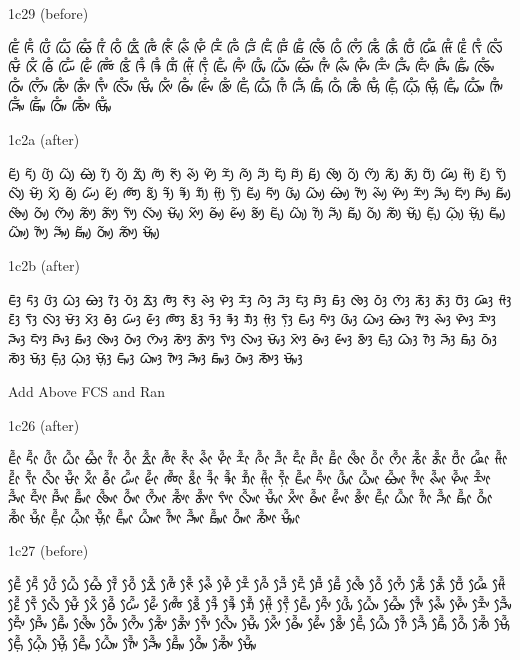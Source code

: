 \noindent
1c29 (before)

\noindent
ᰀᰩᰱ ᰁᰩᰱ ᰂᰩᰱ ᰃᰩᰱ ᰄᰩᰱ ᰅᰩᰱ ᰆᰩᰱ ᰇᰩᰱ ᰈᰩᰱ ᰉᰩᰱ ᰊᰩᰱ ᰋᰩᰱ ᰌᰩᰱ ᰍᰩᰱ ᰎᰩᰱ ᰏᰩᰱ ᰐᰩᰱ ᰑᰩᰱ ᰒᰩᰱ ᰓᰩᰱ ᰔᰩᰱ ᰕᰩᰱ ᰖᰩᰱ ᰗᰩᰱ ᰘᰩᰱ ᰙᰩᰱ ᰚᰩᰱ ᰛᰩᰱ ᰜᰩᰱ ᰝᰩᰱ ᰞᰩᰱ ᰟᰩᰱ ᰠᰩᰱ ᰡᰩᰱ ᰢᰩᰱ ᰣᰩᰱ ᱍᰩᰱ ᱎᰩᰱ ᱏᰩᰱ ᰙ᰷ᰩᰱ ᰛ᰷ᰩᰱ ᰀᰤᰩᰱ ᰁᰤᰩᰱ ᰂᰤᰩᰱ ᰃᰤᰩᰱ ᰄᰤᰩᰱ ᰅᰤᰩᰱ ᰊᰤᰩᰱ ᰋᰤᰩᰱ ᰌᰤᰩᰱ ᰎᰤᰩᰱ ᰏᰤᰩᰱ ᰐᰤᰩᰱ ᰑᰤᰩᰱ ᰒᰤᰩᰱ ᰓᰤᰩᰱ ᰔᰤᰩᰱ ᰕᰤᰩᰱ ᰖᰤᰩᰱ ᰛᰤᰩᰱ ᰜᰤᰩᰱ ᰝᰤᰩᰱ ᰞᰤᰩᰱ ᰟᰤᰩᰱ ᰡᰤᰩᰱ ᰣᰤᰩᰱ ᰀᰥᰩᰱ ᰃᰥᰩᰱ ᰅᰥᰩᰱ ᰎᰥᰩᰱ ᰑᰥᰩᰱ ᰓᰥᰩᰱ ᰕᰥᰩᰱ ᰝᰥᰩᰱ ᰀ᰷ᰥᰩᰱ ᰃ᰷ᰥᰩᰱ ᰝ᰷ᰥᰩᰱ ᰀᰥᰤᰩᰱ ᰃᰥᰤᰩᰱ ᰅᰥᰤᰩᰱ ᰎᰥᰤᰩᰱ ᰑᰥᰤᰩᰱ ᰓᰥᰤᰩᰱ ᰕᰥᰤᰩᰱ ᰝᰥᰤᰩᰱ 

\noindent
1c2a (after)

\noindent
ᰀᰪᰲ ᰁᰪᰲ ᰂᰪᰲ ᰃᰪᰲ ᰄᰪᰲ ᰅᰪᰲ ᰆᰪᰲ ᰇᰪᰲ ᰈᰪᰲ ᰉᰪᰲ ᰊᰪᰲ ᰋᰪᰲ ᰌᰪᰲ ᰍᰪᰲ ᰎᰪᰲ ᰏᰪᰲ ᰐᰪᰲ ᰑᰪᰲ ᰒᰪᰲ ᰓᰪᰲ ᰔᰪᰲ ᰕᰪᰲ ᰖᰪᰲ ᰗᰪᰲ ᰘᰪᰲ ᰙᰪᰲ ᰚᰪᰲ ᰛᰪᰲ ᰜᰪᰲ ᰝᰪᰲ ᰞᰪᰲ ᰟᰪᰲ ᰠᰪᰲ ᰡᰪᰲ ᰢᰪᰲ ᰣᰪᰲ ᱍᰪᰲ ᱎᰪᰲ ᱏᰪᰲ ᰙ᰷ᰪᰲ ᰛ᰷ᰪᰲ ᰀᰤᰪᰲ ᰁᰤᰪᰲ ᰂᰤᰪᰲ ᰃᰤᰪᰲ ᰄᰤᰪᰲ ᰅᰤᰪᰲ ᰊᰤᰪᰲ ᰋᰤᰪᰲ ᰌᰤᰪᰲ ᰎᰤᰪᰲ ᰏᰤᰪᰲ ᰐᰤᰪᰲ ᰑᰤᰪᰲ ᰒᰤᰪᰲ ᰓᰤᰪᰲ ᰔᰤᰪᰲ ᰕᰤᰪᰲ ᰖᰤᰪᰲ ᰛᰤᰪᰲ ᰜᰤᰪᰲ ᰝᰤᰪᰲ ᰞᰤᰪᰲ ᰟᰤᰪᰲ ᰡᰤᰪᰲ ᰣᰤᰪᰲ ᰀᰥᰪᰲ ᰃᰥᰪᰲ ᰅᰥᰪᰲ ᰎᰥᰪᰲ ᰑᰥᰪᰲ ᰓᰥᰪᰲ ᰕᰥᰪᰲ ᰝᰥᰪᰲ ᰀ᰷ᰥᰪᰲ ᰃ᰷ᰥᰪᰲ ᰝ᰷ᰥᰪᰲ ᰀᰥᰤᰪᰲ ᰃᰥᰤᰪᰲ ᰅᰥᰤᰪᰲ ᰎᰥᰤᰪᰲ ᰑᰥᰤᰪᰲ ᰓᰥᰤᰪᰲ ᰕᰥᰤᰪᰲ ᰝᰥᰤᰪᰲ 

\noindent
1c2b (after)

\noindent
ᰀᰫᰳ ᰁᰫᰳ ᰂᰫᰳ ᰃᰫᰳ ᰄᰫᰳ ᰅᰫᰳ ᰆᰫᰳ ᰇᰫᰳ ᰈᰫᰳ ᰉᰫᰳ ᰊᰫᰳ ᰋᰫᰳ ᰌᰫᰳ ᰍᰫᰳ ᰎᰫᰳ ᰏᰫᰳ ᰐᰫᰳ ᰑᰫᰳ ᰒᰫᰳ ᰓᰫᰳ ᰔᰫᰳ ᰕᰫᰳ ᰖᰫᰳ ᰗᰫᰳ ᰘᰫᰳ ᰙᰫᰳ ᰚᰫᰳ ᰛᰫᰳ ᰜᰫᰳ ᰝᰫᰳ ᰞᰫᰳ ᰟᰫᰳ ᰠᰫᰳ ᰡᰫᰳ ᰢᰫᰳ ᰣᰫᰳ ᱍᰫᰳ ᱎᰫᰳ ᱏᰫᰳ ᰙ᰷ᰫᰳ ᰛ᰷ᰫᰳ ᰀᰤᰫᰳ ᰁᰤᰫᰳ ᰂᰤᰫᰳ ᰃᰤᰫᰳ ᰄᰤᰫᰳ ᰅᰤᰫᰳ ᰊᰤᰫᰳ ᰋᰤᰫᰳ ᰌᰤᰫᰳ ᰎᰤᰫᰳ ᰏᰤᰫᰳ ᰐᰤᰫᰳ ᰑᰤᰫᰳ ᰒᰤᰫᰳ ᰓᰤᰫᰳ ᰔᰤᰫᰳ ᰕᰤᰫᰳ ᰖᰤᰫᰳ ᰛᰤᰫᰳ ᰜᰤᰫᰳ ᰝᰤᰫᰳ ᰞᰤᰫᰳ ᰟᰤᰫᰳ ᰡᰤᰫᰳ ᰣᰤᰫᰳ ᰀᰥᰫᰳ ᰃᰥᰫᰳ ᰅᰥᰫᰳ ᰎᰥᰫᰳ ᰑᰥᰫᰳ ᰓᰥᰫᰳ ᰕᰥᰫᰳ ᰝᰥᰫᰳ ᰀ᰷ᰥᰫᰳ ᰃ᰷ᰥᰫᰳ ᰝ᰷ᰥᰫᰳ ᰀᰥᰤᰫᰳ ᰃᰥᰤᰫᰳ ᰅᰥᰤᰫᰳ ᰎᰥᰤᰫᰳ ᰑᰥᰤᰫᰳ ᰓᰥᰤᰫᰳ ᰕᰥᰤᰫᰳ ᰝᰥᰤᰫᰳ 

\noindent
Add Above FCS and Ran

\noindent
1c26 (after)

\noindent
ᰀᰦᰰᰶ ᰁᰦᰰᰶ ᰂᰦᰰᰶ ᰃᰦᰰᰶ ᰄᰦᰰᰶ ᰅᰦᰰᰶ ᰆᰦᰰᰶ ᰇᰦᰰᰶ ᰈᰦᰰᰶ ᰉᰦᰰᰶ ᰊᰦᰰᰶ ᰋᰦᰰᰶ ᰌᰦᰰᰶ ᰍᰦᰰᰶ ᰎᰦᰰᰶ ᰏᰦᰰᰶ ᰐᰦᰰᰶ ᰑᰦᰰᰶ ᰒᰦᰰᰶ ᰓᰦᰰᰶ ᰔᰦᰰᰶ ᰕᰦᰰᰶ ᰖᰦᰰᰶ ᰗᰦᰰᰶ ᰘᰦᰰᰶ ᰙᰦᰰᰶ ᰚᰦᰰᰶ ᰛᰦᰰᰶ ᰜᰦᰰᰶ ᰝᰦᰰᰶ ᰞᰦᰰᰶ ᰟᰦᰰᰶ ᰠᰦᰰᰶ ᰡᰦᰰᰶ ᰢᰦᰰᰶ ᰣᰦᰰᰶ ᱍᰦᰰᰶ ᱎᰦᰰᰶ ᱏᰦᰰᰶ ᰙ᰷ᰦᰰᰶ ᰛ᰷ᰦᰰᰶ ᰀᰤᰦᰰᰶ ᰁᰤᰦᰰᰶ ᰂᰤᰦᰰᰶ ᰃᰤᰦᰰᰶ ᰄᰤᰦᰰᰶ ᰅᰤᰦᰰᰶ ᰊᰤᰦᰰᰶ ᰋᰤᰦᰰᰶ ᰌᰤᰦᰰᰶ ᰎᰤᰦᰰᰶ ᰏᰤᰦᰰᰶ ᰐᰤᰦᰰᰶ ᰑᰤᰦᰰᰶ ᰒᰤᰦᰰᰶ ᰓᰤᰦᰰᰶ ᰔᰤᰦᰰᰶ ᰕᰤᰦᰰᰶ ᰖᰤᰦᰰᰶ ᰛᰤᰦᰰ ᰜᰤᰦᰰᰶ ᰝᰤᰦᰰᰶ ᰞᰤᰦᰰᰶ ᰟᰤᰦᰰᰶ ᰡᰤᰦᰰᰶ ᰣᰤᰦᰰᰶ ᰀᰥᰦᰰᰶ ᰃᰥᰦᰰᰶ ᰅᰥᰦᰰᰶ ᰎᰥᰦᰰᰶ ᰑᰥᰦᰰᰶ ᰓᰥᰦᰰᰶ ᰕᰥᰦᰰᰶ ᰝᰥᰦᰰᰶ ᰀ᰷ᰥᰦᰰᰶ ᰃ᰷ᰥᰦᰰᰶ ᰝ᰷ᰥᰦᰰᰶ ᰀᰥᰤᰦᰰᰶ ᰃᰥᰤᰦᰰᰶ ᰅᰥᰤᰦᰰᰶ ᰎᰥᰤᰦᰰᰶ ᰑᰥᰤᰦᰰᰶ ᰓᰥᰤᰦᰰᰶ ᰕᰥᰤᰦᰰᰶ ᰝᰥᰤᰦᰰᰶ 

\noindent
1c27 (before)

\noindent
ᰀᰧᰰᰶ ᰁᰧᰰᰶ ᰂᰧᰰᰶ ᰃᰧᰰᰶ ᰄᰧᰰᰶ ᰅᰧᰰᰶ ᰆᰧᰰᰶ ᰇᰧᰰᰶ ᰈᰧᰰᰶ ᰉᰧᰰᰶ ᰊᰧᰰᰶ ᰋᰧᰰᰶ ᰌᰧᰰᰶ ᰍᰧᰰᰶ ᰎᰧᰰᰶ ᰏᰧᰰᰶ ᰐᰧᰰᰶ ᰑᰧᰰᰶ ᰒᰧᰰᰶ ᰓᰧᰰᰶ ᰔᰧᰰᰶ ᰕᰧᰰᰶ ᰖᰧᰰᰶ ᰗᰧᰰᰶ ᰘᰧᰰᰶ ᰙᰧᰰᰶ ᰚᰧᰰᰶ ᰛᰧᰰᰶ ᰜᰧᰰᰶ ᰝᰧᰰᰶ ᰞᰧᰰᰶ ᰟᰧᰰᰶ ᰠᰧᰰᰶ ᰡᰧᰰᰶ ᰢᰧᰰᰶ ᰣᰧᰰᰶ ᱍᰧᰰᰶ ᱎᰧᰰᰶ ᱏᰧᰰᰶ ᰙ᰷ᰧᰰᰶ ᰛ᰷ᰧᰰᰶ ᰀᰤᰧᰰᰶ ᰁᰤᰧᰰᰶ ᰂᰤᰧᰰᰶ ᰃᰤᰧᰰᰶ ᰄᰤᰧᰰᰶ ᰅᰤᰧᰰᰶ ᰊᰤᰧᰰᰶ ᰋᰤᰧᰰᰶ ᰌᰤᰧᰰᰶ ᰎᰤᰧᰰᰶ ᰏᰤᰧᰰᰶ ᰐᰤᰧᰰᰶ ᰑᰤᰧᰰᰶ ᰒᰤᰧᰰᰶ ᰓᰤᰧᰰᰶ ᰔᰤᰧᰰᰶ ᰕᰤᰧᰰᰶ ᰖᰤᰧᰰᰶ ᰛᰤᰧᰰᰶ ᰜᰤᰧᰰᰶ ᰝᰤᰧᰰᰶ ᰞᰤᰧᰰᰶ ᰟᰤᰧᰰᰶ ᰡᰤᰧᰰᰶ ᰣᰤᰧᰰᰶ ᰀᰥᰧᰰᰶ ᰃᰥᰧᰰᰶ ᰅᰥᰧᰰᰶ ᰎᰥᰧᰰᰶ ᰑᰥᰧᰰᰶ ᰓᰥᰧᰰᰶ ᰕᰥᰧᰰᰶ ᰝᰥᰧᰰᰶ ᰀ᰷ᰥᰧᰰᰶ ᰃ᰷ᰥᰧᰰᰶ ᰝ᰷ᰥᰧᰰᰶ ᰀᰥᰤᰧᰰᰶ ᰃᰥᰤᰧᰰᰶ ᰅᰥᰤᰧᰰᰶ ᰎᰥᰤᰧᰰᰶ ᰑᰥᰤᰧᰰᰶ ᰓᰥᰤᰧᰰᰶ ᰕᰥᰤᰧᰰᰶ ᰝᰥᰤᰧᰰᰶ 


